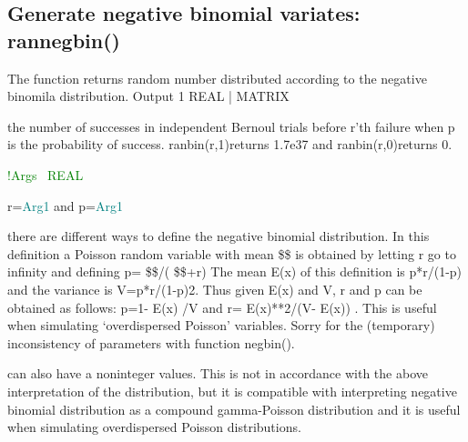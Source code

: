 \begin{itemize}
\subsection{Generate negative binomial variates: \textcolor{VioletRed}{rannegbin}()}
\label{rannegbin}
The  function  returns  random  number  distributed  according to the
negative binomila distribution.
\vspace{0.3cm}
\hline
\vspace{0.3cm}
\noindent Output \tabto{3cm} 1 \tabto{5cm}  REAL | MATRIX  \tabto{7cm}
\begin{changemargin}{3cm}{0cm}
\noindent  the number of successes in
independent Bernoul trials before r’th failure when
p is the probability of success. \textcolor{VioletRed}{ranbin}(r,1)returns 1.7e37 and
\textcolor{VioletRed}{ranbin}(r,0)returns 0.
\end{changemargin}
\vspace{0.3cm}
\hline
\vspace{0.3cm}
\noindent \textcolor{green}{!Args\,\tabto{3cm}\,\,\tabto{5cm}\,\,REAL\,\tabto{7cm}\,}
\begin{changemargin}{3cm}{0cm}
\noindent  r=\textcolor{teal}{Arg1} and p=\textcolor{teal}{Arg1}
\end {changemargin}
\hline
\vspace{0.2cm}

\begin{note}
there are different ways to define the negative binomial distribution. In this definition
a Poisson random variable with mean \$\lamda\$ is obtained by letting r go
to infinity and defining p= \$\lamda\$/( \$\lamda\$+r)
The mean E(x) of this definition is p*r/(1-p) and the variance is V=p*r/(1-p)2. Thus given
E(x) and V, r and p can be obtained as follows: p=1- E(x) /V and r= E(x)**2/(V- E(x)) . This is useful when
simulating ‘overdispersed Poisson’ variables. Sorry for the (temporary) inconsistency of parameters with
function \textcolor{VioletRed}{negbin}().
\end{note}
\begin{note}
can also have a noninteger values. This is not in accordance with the above
interpretation of the distribution, but it is compatible with interpreting negative binomial
distribution as a compound gamma-Poisson distribution and it is useful when simulating
overdispersed Poisson distributions.
\end{note}

\end{itemize}
